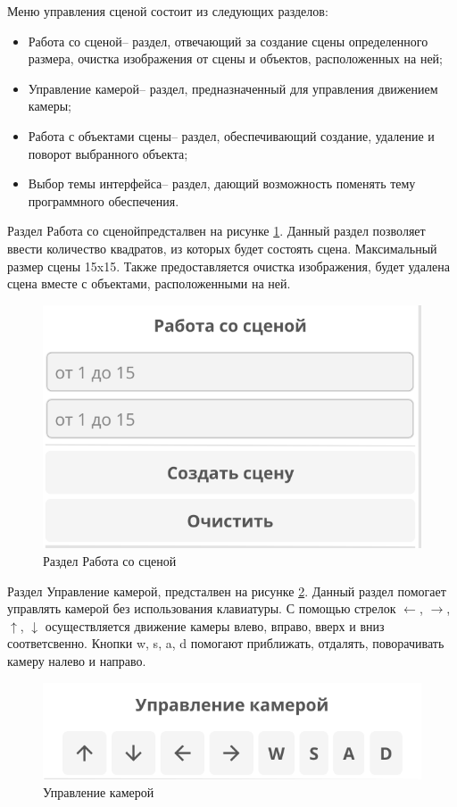 Меню управления сценой состоит из следующих разделов:
\begin{itemize}
    \item \guillemotleft Работа со сценой\guillemotright-- раздел, отвечающий за создание сцены 
    определенного размера, очистка изображения от сцены и объектов, расположенных на ней;
    \item \guillemotleft Управление камерой\guillemotright -- раздел, предназначенный для управления движением камеры;
    \item \guillemotleft Работа с объектами сцены\guillemotright -- раздел, обеспечивающий создание, удаление и поворот выбранного объекта;
    \item \guillemotleft Выбор темы интерфейса\guillemotright -- раздел, дающий возможность поменять тему программного обеспечения. 
\end{itemize}

Раздел \guillemotleft Работа со сценой\guillemotright предсталвен на рисунке \ref{img:entry}. Данный раздел позволяет 
ввести количество квадратов, из которых будет состоять сцена. Максимальный размер сцены 15x15. Также предоставляется очистка изображения, будет удалена
сцена вместе с объектами, расположенными на ней.

\clearpage
\begin{figure}[h]
    \centering
    \includegraphics[width=0.5\linewidth]{img/entry.png}
    \caption{Раздел \guillemotleft Работа со сценой\guillemotright}
    \label{img:entry}
\end{figure}
\noindent

Раздел \guillemotleft Управление камерой\guillemotright, предсталвен на рисунке \ref{img:camera}. Данный раздел помогает управлять 
камерой без использования клавиатуры. С помощью стрелок \(\leftarrow\), \(\rightarrow\), \(\uparrow\), \(\downarrow\) осуществляется движение
камеры влево, вправо, вверх и вниз соответсвенно. Кнопки w, s, a, d помогают приближать, отдалять, поворачивать камеру налево и направо.

\begin{figure}[h]
    \centering
    \includegraphics[width=0.8\linewidth]{img/camera.png}
    \caption{\guillemotleft Управление камерой\guillemotright}
    \label{img:camera}
\end{figure}
\noindent

